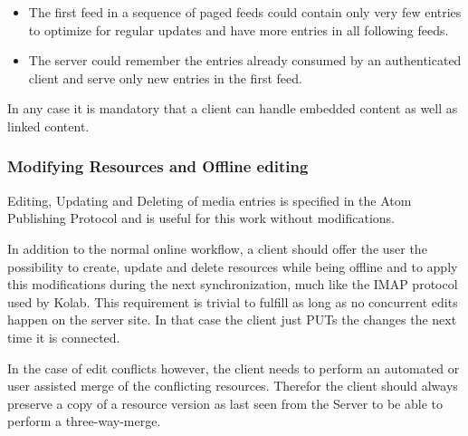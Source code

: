 \documentclass[12pt,a4paper,twoside]{scrartcl}		%
\newcommand{\citeurl}[2]{\url{#1} (#2)}
\begin{document}
\begin{itemize}
\item The first feed in a sequence of paged feeds could contain only very few
  entries to optimize for regular updates and have more entries in all following
  feeds.
\item The server could remember the entries already consumed by an authenticated
  client and serve only new entries in the first feed.
\end{itemize}

In any case it is mandatory that a client can handle embedded content as well as
linked content.

\subsubsection{Modifying Resources and Offline editing}

Editing, Updating and Deleting of media entries is specified in the Atom
Publishing Protocol and is useful for this work without modifications.


In addition to the normal online workflow, a client should offer the user the
possibility to create, update and delete resources while being offline and to
apply this modifications during the next synchronization, much like the IMAP
protocol used by Kolab. This requirement is trivial to fulfill as long as no
concurrent edits happen on the server site. In that case the client just PUTs
the changes the next time it is connected.

In the case of edit conflicts however, the client needs to perform an automated
or user assisted merge of the conflicting resources. Therefor the client should
always preserve a copy of a resource version as last seen from the Server to be
able to perform a three-way-merge.
\end{document}
